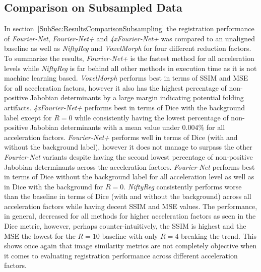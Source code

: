 \subsection{Comparison on Subsampled Data} \label{SubSec:DiscussionComparisonSubsampling}
In section~\ref{SubSec:ResultsComparisonSubsampling} the registration performance of \emph{Fourier-Net}, \emph{Fourier-Net+} and \emph{4xFourier-Net+} was compared to an unaligned baseline as well as \emph{NiftyReg} and \emph{VoxelMorph} for four different reduction factors. To summarize the results, \emph{Fourier-Net+} is the fastest method for all acceleration levels while \emph{NiftyReg} is far behind all other methods in execution time as it is not machine learning based. \emph{VoxelMorph} performs best in terms of SSIM and MSE for all acceleration factors, however it also has the highest percentage of non-positive Jabobian determinants by a large margin indicating potential folding artifacts. \emph{4xFourier-Net+} performs best in terms of Dice with the background label except for $R=0$ while consistently having the lowest percentage of non-positive Jabobian determinants with a mean value under $0.004\%$ for all acceleration factors. \emph{Fourier-Net+} performs well in terms of Dice (with and without the background label), however it does not manage to surpass the other \emph{Fourier-Net} variants despite having the second lowest percentage of non-positive Jabobian determinants across the acceleration factors. \emph{Fourier-Net} performs best in terms of Dice without the background label for all acceleration level as well as in Dice with the background for $R=0$. \emph{NiftyReg} consistently performs worse than the baseline in terms of Dice (with and without the background) across all acceleration factors while having decent SSIM and MSE values. The performance, in general, decreased for all methods for higher acceleration factors as seen in the Dice metric, however, perhaps counter-intuitively, the SSIM is highest and the MSE the lowest for the $R=10$ baseline with only $R=4$ breaking the trend. This shows once again that image similarity metrics are not completely objective when it comes to evaluating registration performance across different acceleration factors.\\
